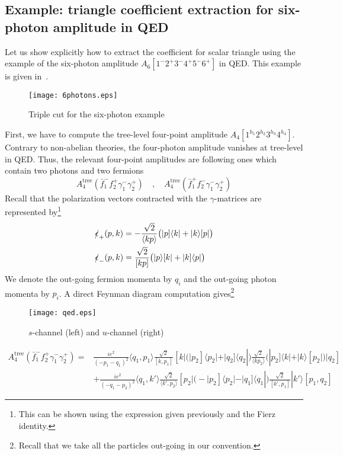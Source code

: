 \subsection*{Example: triangle coefficient extraction for six-photon amplitude in QED}
Let us show explicitly how to extract the coefficient for scalar triangle using the example of the six-photon amplitude $A_6[1^-2^+3^-4^+5^-6^+]$ in QED.
This example is given in~\cite{Forde:2007mi}.
\begin{figure}
  \centering
  \texttt{[image: 6photons.eps]}
  \caption{Triple cut for the six-photon example}
  \label{fig-6photons}
\end{figure}
First, we have to compute the tree-level four-point amplitude $A_4[1^{h_1}2^{h_2}3^{h_3}4^{h_4}]$. 
Contrary to non-abelian theories, the four-photon amplitude vanishes at tree-level in QED.
Thus, the relevant four-point amplitudes are following ones which contain two photons and two fermions
\begin{equation}
A_4^{\mathrm{tree}}(\bar{f}_1^- f_2^+ \gamma_1^-\gamma_2^+)
\quad,\quad
A_4^{\mathrm{tree}}(\bar{f}_1^+ f_2^- \gamma_1^-\gamma_2^+)
\end{equation}
Recall that the polarization vectors contracted with the $\gamma$-matrices are represented by\footnote{This can be shown using the expression given previously and the Fierz identity.}
\begin{equation}
\begin{split}
& \slashed{\epsilon}_+(p,k) = -\frac{\sqrt{2}}{\langle kp\rangle}\big(|p]\langle k| + |k\rangle[p|\big)
\\
& \slashed{\epsilon}_-(p,k) = \frac{\sqrt{2}}{[kp]}\big(|p\rangle [k| + |k]\langle p|\big)
\end{split}
\end{equation}
We denote the out-going fermion momenta by $q_i$ and the out-going photon momenta by $p_i$. 
A direct Feynman diagram computation gives\footnote{Recall that we take all the particles out-going in our convention.}
\begin{figure}[h]
  \centering
  \texttt{[image: qed.eps]}
  \caption{$s$-channel (left) and $u$-channel (right)}
  \label{fig-qed}
\end{figure}
%
\begin{equation}
\begin{split}
A_{4}^{\mathrm{tree}}(\bar{f}_1^- f_2^+ \gamma_1^-\gamma_2^+) 
= &
\frac{ie^2}{(-p_1 - q_1)^2}\langle q_1, p_1\rangle \frac{\sqrt{2}}{[k, p_1]}
[k|\big(|p_2] \langle p_2| + |q_2]\langle q_2|\big)
\frac{\sqrt{2}}{\langle k p_2\rangle}
\big(|p_2]\langle k| + |k\rangle[p_2|\big) |q_2]
\\
&
+\frac{ie^2}{(-q_1-p_2)^2}\langle q_1, k'\rangle
\frac{\sqrt{2}}{\langle k', p_2\rangle}[p_2|
\big( -|p_2]\langle p_2| - |q_1]\langle q_1|\big)
\frac{\sqrt{2}}{[k', p_1]}|k'\rangle [p_1, q_2]
\end{split}
\end{equation}

